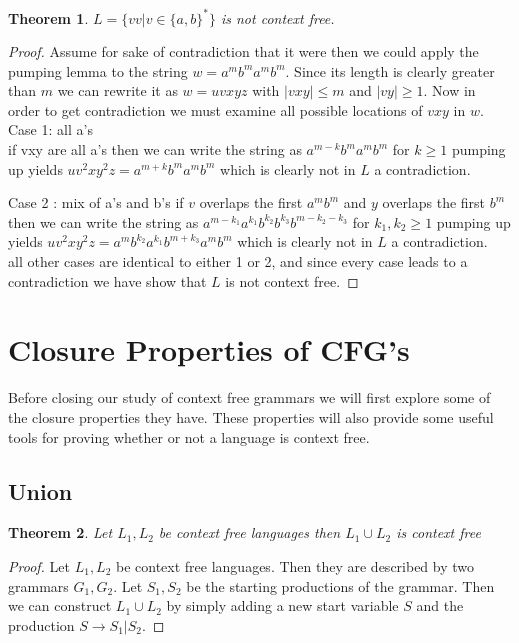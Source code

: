\documentclass[11pt]{exam}
\newtheorem{theorem}{Theorem}[section]
\begin{document}
\begin{theorem}
$L = \{vv | v \in \{a,b\}^* \}$ is not context free.
\end{theorem}

\begin{proof}
 Assume for sake of contradiction that it were then we could apply the pumping lemma to the string $w = a^mb^ma^mb^m$. Since its length is clearly greater than $m$ we can rewrite it as $w = uvxyz$ with $|vxy| \leq m$ and $|vy| \geq 1$. Now in order to get  contradiction we must examine all possible locations of $vxy$ in $w$.\\

Case 1: all a's\\
if vxy are all a's then we can write the string as $a^{m-k}b^ma^mb^m$ for $k \geq 1$ pumping up yields $uv^2xy^2z = a^{m+k}b^ma^mb^m$ which is clearly not in $L$ a contradiction. 

Case 2 : mix of a's and b's
if $v$ overlaps the first $a^mb^m$ and $y$ overlaps the first $b^m$ then we can write the string as $a^{m-k_1}a^{k_1}b^{k_2}b^{k_3}b^{m-k_2-k_3}$ for $k_1,k_2 \geq 1$ pumping up yields $uv^2xy^2z = a^mb^{k_2}a^{k_1}b^{m+k_3}a^mb^m$ which is clearly not in $L$ a contradiction. \\

all other cases are identical to either 1 or 2, and since every case leads to a contradiction we have show that $L$ is not context free.
\end{proof}

\newpage

\section{Closure Properties of CFG's}
Before closing our study of context free grammars we will first explore some of the closure properties they have. These properties will also provide some useful tools for proving whether or not a language is context free.

\subsection{Union} 

\begin{theorem}
Let $L_1,L_2$ be context free languages then $L_1 \cup L_2$ is context free
\end{theorem}
\begin{proof}
Let $L_1,L_2$ be context free languages. Then they are described by two grammars $G_1,G_2$. Let $S_1,S_2$ be the starting productions of the grammar. Then we can construct $L_1 \cup L_2$ by simply adding a new start variable $S$ and the production $S \rightarrow S_1 | S_2$.
\end{proof}
\end{document}
